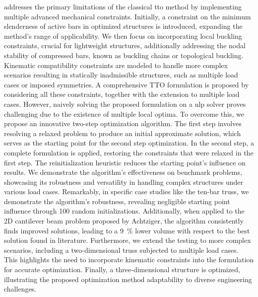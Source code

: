  addresses the primary limitations of the classical \gls{tto} method by implementing multiple advanced mechanical constraints. Initially, a constraint on the minimum slenderness of active bars in optimized structures is introduced, expanding the method's range of applicability. We then focus on incorporating local buckling constraints, crucial for lightweight structures, additionally addressing the nodal stability of compressed bars, known as buckling chains or topological buckling. Kinematic compatibility constraints are modeled to handle more complex scenarios resulting in statically inadmissible structures, such as multiple load cases or imposed symmetries. A comprehensive TTO formulation is proposed by considering all these constraints, together with the extension to multiple load cases. However, naively solving the proposed formulation on a \gls{nlp} solver proves challenging due to the existence of multiple local optima. To overcome this, we propose an innovative two-step optimization algorithm. The first step involves resolving a relaxed problem to produce an initial approximate solution, which serves as the starting point for the second step optimization. In the second step, a complete formulation is applied, restoring the constraints that were relaxed in the first step. The reinitialization heuristic reduces the starting point's influence on results. We demonstrate the algorithm's effectiveness on benchmark problems, showcasing its robustness and versatility in handling complex structures under various load cases. Remarkably, in specific case studies like the ten-bar truss, we demonstrate the algorithm's robustness, revealing negligible starting point influence through 100 random initializations. Additionally, when applied to the 2D cantilever beam problem proposed by Achtziger, the algorithm consistently finds improved solutions, leading to a \qty{9}{\%} lower volume with respect to the best solution found in literature. Furthermore, we extend the testing to more complex scenarios, including a two-dimensional truss subjected to multiple load cases. This highlights the need to incorporate kinematic constraints into the formulation for accurate optimization. Finally, a three-dimensional structure is optimized, illustrating the proposed optimization method adaptability to diverse engineering challenges.

